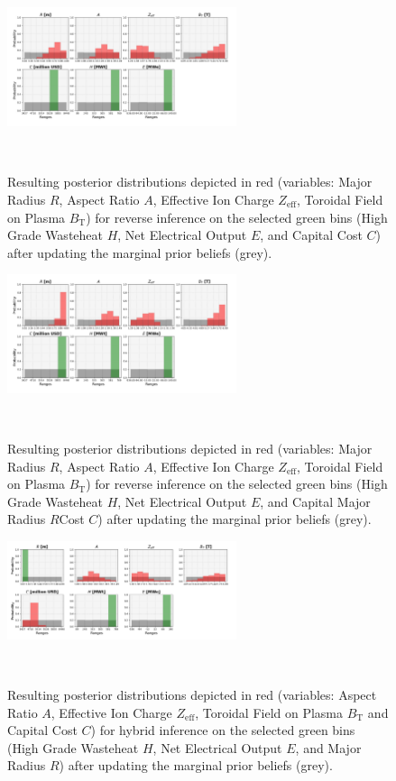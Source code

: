 \begin{figure}[ht]
    \centering
    \includegraphics[width=0.6\textwidth]{figures/TE_results/march_data/config(57)_3outputs_V2_8.png}
    \caption{Resulting posterior distributions depicted in red (variables: Major Radius $R$, Aspect Ratio $A$, Effective Ion Charge $Z_{\text{eff}}$, Toroidal Field on Plasma $B_{\text{T}}$) for reverse
    inference on the selected green bins (High Grade Wasteheat $H$, Net Electrical Output $E$, and  Capital Cost $C$) after updating the marginal prior beliefs (grey).}~\label{fig:config(57)_3outputs_V2_8}
\end{figure}

\begin{figure}[ht]
    \centering
    \includegraphics[width=0.6\textwidth]{figures/TE_results/march_data/config(57)_3outputs_V2_9.png}
    \caption{Resulting posterior distributions depicted in red (variables: Major Radius $R$, Aspect Ratio $A$, Effective Ion Charge $Z_{\text{eff}}$, Toroidal Field on Plasma $B_{\text{T}}$) for reverse
    inference on the selected green bins (High Grade Wasteheat $H$, Net Electrical Output $E$, and  Capital Major Radius $R$Cost $C$) after updating the marginal prior beliefs (grey).}~\label{fig:config(57)_3outputs_V2_9}
\end{figure}

\begin{figure}[ht]
    \centering
    \includegraphics[width=0.6\textwidth]{figures/TE_results/march_data/config(57)_outputs(3)_hybrid_2.png}
    \caption{Resulting posterior distributions depicted in red (variables: Aspect Ratio $A$, Effective Ion Charge $Z_{\text{eff}}$, Toroidal Field on Plasma $B_{\text{T}}$ and Capital Cost $C$) for hybrid
    inference on the selected green bins (High Grade Wasteheat $H$, Net Electrical Output $E$, and Major Radius $R$) after updating the marginal prior beliefs (grey).}~\label{fig:config(57)_outputs(3)_hybrid_2}
\end{figure}

